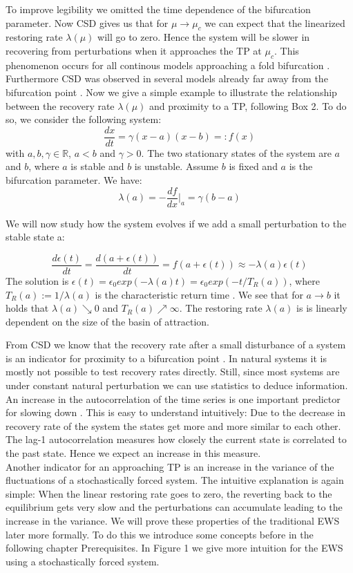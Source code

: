 \documentclass[%
thesis=student,%
coverpage=false,%
titlepage=false,%
headmarks=true, %
german,%
font=libertine, %
math=newpxtx, %
BCOR=5mm,%
coverBCOR=11mm%
]{tumbook}
\begin{document}
To improve legibility we omitted the time dependence of the bifurcation parameter. Now CSD gives us that for $\mu \rightarrow \mu_{c}$ we can expect that the linearized restoring rate $\lambda(\mu)$ will go to zero. Hence the system will be slower in recovering from perturbations when it approaches the TP at $\mu_{c}$. This phenomenon occurs for all continous models approaching a fold bifurcation \cite{Wissel:1984}. Furthermore CSD was observed in several models already far away from the bifurcation point \cite{VanNes:2007}. Now we give a simple example to illustrate the relationship between the recovery rate $\lambda(\mu)$ and proximity to a TP, following \cite{Scheffer:2009} Box 2. To do so, we consider the following system: 
\begin{equation}
    \frac{dx}{dt} = \gamma (x-a)(x-b) =: f(x) \label{eq:1}
\end{equation}
with $a,b,\gamma \in \mathbb{R}$, $a < b$ and $\gamma > 0$. The two stationary states of the system are $a$ and $b$, where $a$ is stable and $b$ is unstable. Assume $b$ is fixed and $a$ is the bifurcation parameter.
We have: 
\[\lambda (a) = -\frac{df}{dx}|_{a} = \gamma(b-a)\] 

We will now study how the system evolves if we add a small perturbation to the stable state a:

\[
\frac{d\epsilon(t)}{dt} = \frac{d(a + \epsilon(t))}{dt} = f(a + \epsilon(t)) \approx 
 -\lambda(a)\epsilon(t)
\]
The solution is $\epsilon(t) = \epsilon_{0}exp(-\lambda(a)t) = \epsilon_{0}exp(-t/T_{R}(a))$, where $T_{R}(a) := 1/ \lambda(a)$ is the characteristic return time \cite{Wissel:1984}.
We see that for $a \rightarrow b$ it holds that $\lambda(a) \searrow 0$ and $T_{R}(a)\nearrow \infty$. The restoring rate $\lambda(a)$ is is linearly dependent on the size of the basin of attraction.

From CSD we know that the recovery rate after a small disturbance of a system is an indicator for proximity to a bifurcation point \cite{VanNes:2007}. In natural systems it is mostly not possible to test recovery rates directly. Still, since most systems are under constant natural perturbation we can use statistics to deduce information. An increase in the autocorrelation of the time series is one important predictor for slowing down \cite{Ives:1995}. This is easy to understand intuitively: Due to the decrease in recovery rate of the system the states get more and more similar to each other. The lag-1 autocorrelation measures how closely the current state is correlated to the past state. Hence we expect an increase in this measure. \\
Another indicator for an approaching TP is an increase in the variance of the fluctuations of a stochastically forced system. The intuitive explanation is again simple: When the linear restoring rate goes to zero, the reverting back to the equilibrium gets very slow and the perturbations can accumulate leading to the increase in the variance. 
We will prove these properties of the traditional EWS later more formally. To do this we introduce some concepts before in the following chapter Prerequisites. In Figure 1 we give more intuition for the EWS using a stochastically forced system.
\end{document}
